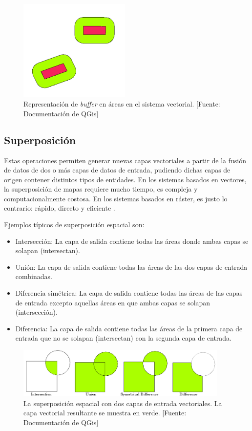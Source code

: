 \begin{figure}[H]
    \centering
    \includegraphics[width=5.5cm]{polygon_buffer.png}
    \caption{Representación de \textit{buffer} en áreas en el sistema vectorial. [Fuente: Documentación de QGis]}
    \label{fig:polygonBuffer}
\end{figure}

\subsection{Superposición}

Estas operaciones permiten generar nuevas capas vectoriales a partir de la fusión de datos de dos o más capas de datos de entrada, pudiendo dichas capas de origen contener distintos tipos de entidades. En los sistemas basados en vectores, la superposición de mapas requiere mucho tiempo, es compleja y computacionalmente costosa. En los sistemas basados en ráster, es justo lo contrario: rápido, directo y eficiente \citep{Heywood2006AnSystems}.

Ejemplos típicos de superposición espacial son:

\begin{itemize}
    \item Intersección: La capa de salida contiene todas las áreas donde ambas capas se solapan (intersectan).
    \item Unión: La capa de salida contiene todas las áreas de las dos capas de entrada combinadas.
    \item Diferencia simétrica: La capa de salida contiene todas las áreas de las capas de entrada excepto aquellas áreas en que ambas capas se solapan (intersección).
    \item Diferencia: La capa de salida contiene todas las áreas de la primera capa de entrada que no se solapan (intersectan) con la segunda capa de entrada.
\end{itemize} 

\begin{figure}[H]
    \centering
    \includegraphics[width=10.5cm]{overlay_operations.png}
    \caption{La superposición espacial con dos capas de entrada vectoriales. La capa vectorial resultante se muestra en verde. [Fuente: Documentación de QGis]}
    \label{fig:overlay}
\end{figure}

